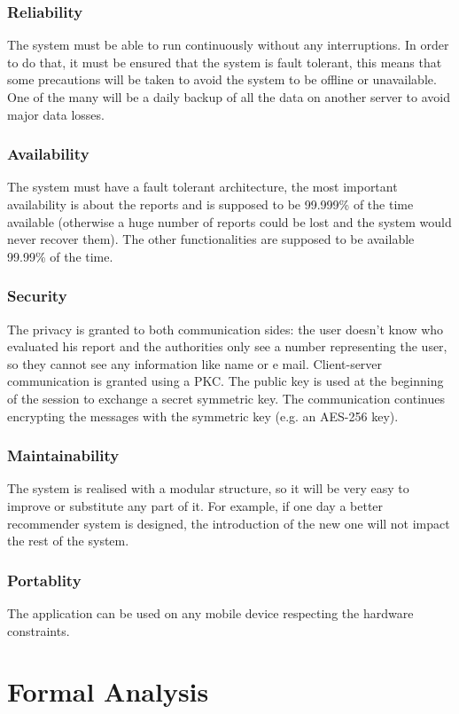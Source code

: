 \documentclass[12pt,a4paper]{report}
\begin{document}
		\subsection{Reliability}
			The system must be able to run continuously without any interruptions. In order to do that, it must 
			be ensured  that  the system is fault tolerant, this means that some precautions will be taken to avoid the system
			to be offline or unavailable. One of the many will be a daily backup of all the data on another server to avoid major
			data losses.
		\subsection{Availability}
			The system must have a fault tolerant architecture, the most important availability is about the reports and is supposed
			to be 99.999\%  of the time available (otherwise a huge number of reports could be lost and the system would never recover them). The other
			functionalities are supposed to be available 99.99\% of the time.
		\subsection{Security}
			The privacy is granted to both communication sides: the user doesn't know who evaluated his report and the authorities
			only see a number representing the user, so they cannot see any information like name or e mail. Client-server communication is granted using a PKC. The public key is used at the beginning of the session to exchange a secret symmetric key. The communication continues encrypting the messages with the symmetric key (e.g. an AES-256 key). 
		\subsection{Maintainability}
			The system is realised with a modular structure, so it will be very easy to improve or substitute any part of it. For example, if one day a better recommender system is designed, the
			introduction of the new one will not impact the rest of the system.
		\subsection{Portablity}
			The application can be used on any mobile device respecting the hardware constraints.


	

\chapter{Formal Analysis}
\end{document}
